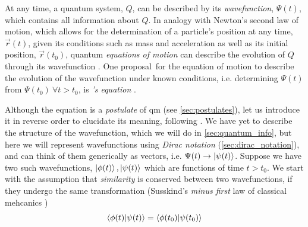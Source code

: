At any time, a quantum system, $Q$, can be described by its \emph{wavefunction}, $\Psi(t)$, 
    which contains all information about $Q$. 
In analogy with Newton's second law of motion, 
    which allows for the determination of a particle's position at any time, $\vec{r}(t)$, 
    given its conditions such as mass and acceleration as well as its initial position, $\vec{r}(t_0)$,  
    quantum \emph{equations of motion} can describe the evolution of $Q$ through its wavefunction \cite{dirac1981principles}. 
One proposal\footnotemark \ for the equation of motion 
    to describe the evolution of the wavefunction under known conditions, 
    i.e. determining $\Psi(t)$ from $\Psi(t_0) \ \forall t > t_0$, 
    is \emph{\schrodinger's equation}  \cite{griffiths2018introduction, mart2020introduce, nelson1966derivation}.
\par 

Although the \schrodinger equation is a \emph{postulate} of \gls{qm} (see \cref{sec:postulates}), 
    let us introduce it in reverse order to elucidate its meaning, following \cite{susskind2014quantum}. 
We have yet to describe the structure of the wavefunction, which we will do in \cref{sec:quantum_info},
    but here we will represent wavefunctions using \emph{Dirac notation} (\cref{sec:dirac_notation}), 
    and can think of them generically as vectors, i.e. $\Psi(t) \rightarrow \ket{\psi(t)}$. 
Suppose we have two such wavefunctions, $\ket{\phi(t)}, \ket{\psi(t)}$ which are functions of time $t > t_0$.
We start with the assumption that \emph{similarity} is conserved between two wavefunctions,
    if they undergo the same transformation 
    (Susskind's \emph{minus first} law of classical mehcanics \cite{susskind2014quantum})
\begin{equation}
    \label{eqn:conservation_simularity}
    \braket{\phi(t) | \psi(t)} = \braket{\phi(t_0) | \psi(t_0)}
\end{equation}

